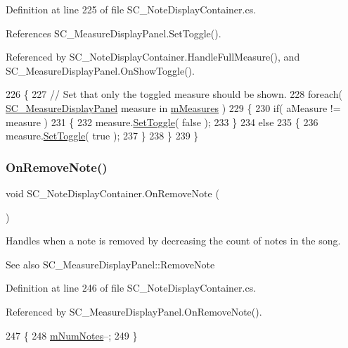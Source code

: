 Definition at line 225 of file S\+C\+\_\+\+Note\+Display\+Container.\+cs.



References S\+C\+\_\+\+Measure\+Display\+Panel.\+Set\+Toggle().



Referenced by S\+C\+\_\+\+Note\+Display\+Container.\+Handle\+Full\+Measure(), and S\+C\+\_\+\+Measure\+Display\+Panel.\+On\+Show\+Toggle().


\begin{DoxyCode}
226     \{
227         \textcolor{comment}{// Set that only the toggled measure should be shown.}
228         \textcolor{keywordflow}{foreach}( \hyperlink{class_s_c___measure_display_panel}{SC\_MeasureDisplayPanel} measure \textcolor{keywordflow}{in} 
      \hyperlink{group___s_c___n_d_c_priv_var_gaa072fb53f6bd6646bc85f2ebc2a02229}{mMeasures} )
229         \{
230             \textcolor{keywordflow}{if}( aMeasure != measure )
231             \{
232                 measure.\hyperlink{group___s_c___m_d_p_pub_func_ga6512fa5010bcecd85f7e8542cea91310}{SetToggle}( \textcolor{keyword}{false} );
233             \}
234             \textcolor{keywordflow}{else}
235             \{
236                 measure.\hyperlink{group___s_c___m_d_p_pub_func_ga6512fa5010bcecd85f7e8542cea91310}{SetToggle}( \textcolor{keyword}{true} );
237             \}
238         \}
239     \}
\end{DoxyCode}
\mbox{\label{group___s_c___n_d_c_handlers_ga6dbbf12e55681d13f43e489dd4a100dc}} 
\subsubsection{\texorpdfstring{On\+Remove\+Note()}{OnRemoveNote()}}
{\footnotesize\ttfamily void S\+C\+\_\+\+Note\+Display\+Container.\+On\+Remove\+Note (\begin{DoxyParamCaption}{ }\end{DoxyParamCaption})}



Handles when a note is removed by decreasing the count of notes in the song. 

\begin{DoxySeeAlso}{See also}
S\+C\+\_\+\+Measure\+Display\+Panel\+::\+Remove\+Note 
\end{DoxySeeAlso}


Definition at line 246 of file S\+C\+\_\+\+Note\+Display\+Container.\+cs.



Referenced by S\+C\+\_\+\+Measure\+Display\+Panel.\+On\+Remove\+Note().


\begin{DoxyCode}
247     \{
248         \hyperlink{group___s_c___n_d_c_priv_var_gae06a4919a63806ed57b2040f41b7ca1b}{mNumNotes}--;
249     \}
\end{DoxyCode}

